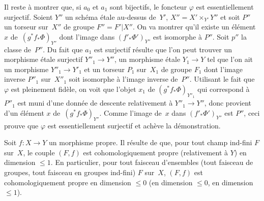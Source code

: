 Il reste \`a montrer que, si $a_0$ et $a_1$ sont bijectifs, le
foncteur $\varphi$ est essentiellement surjectif. Soient $Y''$ un
sch\'ema \'etale au-dessus de~$Y'$, $X'' = X' \times_{Y'} Y''$ et
soit $P''$ un torseur sur~$X''$ de groupe $F'' = F'|X''$. On va
montrer qu'il existe un \'el\'ement~$x$ de~$(g^* f_*
\Phi)_{Y''}$ dont l'image dans $(f'_* \Phi')_{Y''}$ est isomorphe
\`a $P''$. Soit $p''$ la classe de~$P''$. Du fait que $a_1$ est
surjectif r\'esulte que l'on peut trouver un morphisme \'etale
surjectif $Y''_1 \to Y''$, un morphisme \'etale $Y_1 \to Y$ tel que
l'on ait un morphisme $Y''_1 \to Y'_1$ et un torseur $P_1$ sur~$X_1$
de groupe $F_1$ dont l'image inverse $P''_1$ sur~$X''_1$ soit
isomorphe \`a l'image inverse de~$P''$. Utilisant le fait que
$\varphi$ est pleinement fid\`ele, on voit que l'objet $x_1$ de
$(g^* f_* \Phi)_{Y''_1}$ qui correspond \`a $P''_1$ est muni
d'une donn\'ee de descente relativement \`a $Y''_1 \to Y''$, donc
provient d'un \'el\'ement $x$ de~$(g^* f_*
\Phi)_{Y''}$. Comme l'image de~$x$ dans $(f'_* \Phi')_{Y''}$ est
$P''$, ceci prouve que $\varphi$ est essentiellement surjectif et
ach\`eve la d\'emonstration.

\begin{exemple}
\label{XIII.1.4}
Soit $f \colon X \to Y$ un morphisme propre. Il r\'esulte de \cite[VII
2.2.2]{XIII.2} que, pour tout champ ind-fini $F$ sur~$X$, le couple $(F,f)$
est cohomologiquement propre (relativement \`a $Y$) en dimension
$\leqslant 1$. En particulier, pour tout faisceau d'ensembles
(\resp tout faisceau de groupes, \resp tout faisceau en groupes
ind-fini) $F$ sur~$X$, $(F,f)$ est cohomologiquement
propre en dimension $\leqslant 0$ (\resp en dimension $\leqslant 0$,
\resp en dimension $\leqslant 1$).
\end{exemple}

